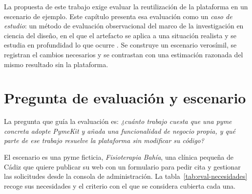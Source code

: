 
La propuesta de este trabajo exige evaluar la reutilización de la plataforma
en un escenario de ejemplo. Este capítulo presenta esa evaluación como un
\emph{caso de estudio}: un método de evaluación observacional del marco de la
investigación en ciencia del diseño, en el que el artefacto se aplica a una
situación realista y se estudia en profundidad lo que ocurre
\cite{hevner2004}. Se construye un escenario verosímil, se registran el
cambios necesarios y se contrastan con una estimación razonada
del mismo resultado sin la plataforma.

\section{Pregunta de evaluación y escenario}
\label{sec:eval-escenario}

La pregunta que guía la evaluación es: \emph{¿cuánto trabajo cuesta que una
pyme concreta adopte PymeKit y añada una funcionalidad de negocio propia, y
qué parte de ese trabajo resuelve la plataforma sin modificar su código?}

El escenario es una pyme ficticia, \emph{Fisioterapia Bahía}, una clínica
pequeña de Cádiz que quiere publicar su web con un formulario para pedir cita
y gestionar las solicitudes desde la consola de administración. La
tabla~\ref{tab:eval-necesidades} recoge sus necesidades y el criterio con el
que se considera cubierta cada una.

